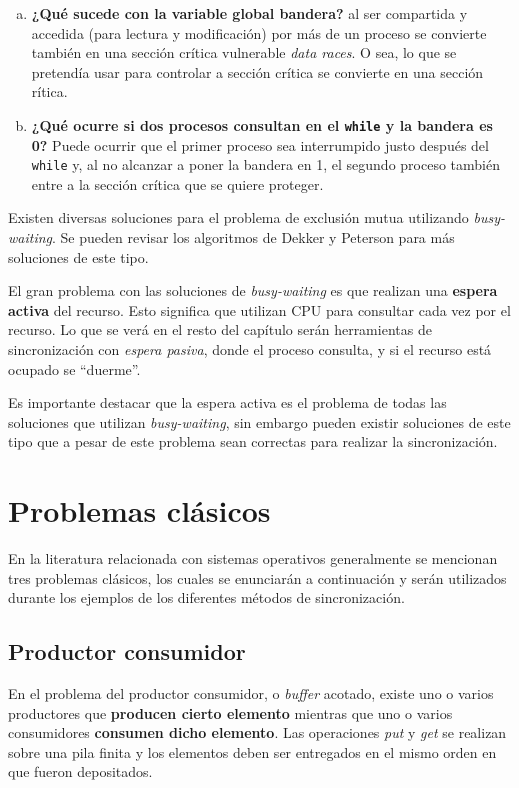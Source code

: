 \begin{enumerate}[a)]

\item \textbf{¿Qué sucede con la variable global bandera?} al ser compartida y
accedida (para lectura y modificación) por más de un proceso se convierte
también  en una sección crítica vulnerable \emph{data races}. O sea, lo que
se pretendía usar para controlar a sección crítica se convierte en una sección
rítica.                                                         
	
\item \textbf{¿Qué ocurre si dos procesos consultan en el \texttt{while} y la
bandera es 0?} Puede ocurrir que el primer proceso sea interrumpido justo
después del \texttt{while} y, al no alcanzar a poner la bandera en 1, el segundo
proceso también entre a la sección crítica que se quiere proteger.
	
\end{enumerate}

Existen diversas soluciones para el problema de exclusión mutua utilizando
\emph{busy-waiting}. Se pueden revisar los algoritmos de Dekker y Peterson
para más soluciones de este tipo.

El gran problema con las soluciones de \emph{busy-waiting} es que realizan una
\textbf{espera activa} del recurso. Esto significa que utilizan CPU para
consultar cada vez por el recurso. Lo que se verá en el resto del capítulo serán
herramientas de sincronización con \emph{espera pasiva}, donde el proceso
consulta, y si el recurso está ocupado se ``duerme''.

Es importante destacar que la espera activa es el problema de todas las
soluciones que utilizan \emph{busy-waiting}, sin embargo pueden existir
soluciones de este tipo que a pesar de este problema sean correctas para
realizar la sincronización.

\section{Problemas clásicos}
En la literatura relacionada con sistemas operativos generalmente se mencionan
tres problemas clásicos, los cuales se enunciarán a continuación y serán
utilizados durante los ejemplos de los diferentes métodos de sincronización.

\subsection{Productor consumidor}
En el problema del productor consumidor, o \emph{buffer} acotado, existe uno o
varios productores que \textbf{producen cierto elemento} mientras que uno o
varios consumidores \textbf{consumen dicho elemento}. Las operaciones
\emph{put} y \emph{get} se realizan sobre una pila finita y los
elementos deben ser entregados en el mismo orden en que fueron depositados.


